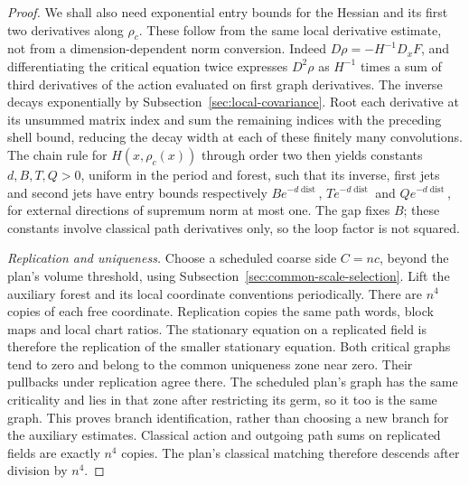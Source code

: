 \begin{proof}
We shall also need exponential entry bounds for the Hessian and its
first two derivatives along $\rho_c$. These follow from the same
local derivative estimate, not from a dimension-dependent norm
conversion. Indeed $D\rho=-H^{-1}D_xF$, and differentiating the
critical equation twice expresses $D^2\rho$ as $H^{-1}$ times a sum
of third derivatives of the action evaluated on first graph derivatives.
The inverse decays exponentially by Subsection~\ref{sec:local-covariance}.
Root each derivative at its unsummed matrix index and sum the remaining
indices with the preceding shell bound, reducing the decay width at
each of these finitely many convolutions. The chain rule for
$H(x,\rho_c(x))$ through order two then yields constants
$d,B,T,Q>0$, uniform in the period and forest, such that its inverse,
first jets and second jets have entry bounds respectively
$Be^{-d\operatorname{dist}}$, $Te^{-d\operatorname{dist}}$ and
$Qe^{-d\operatorname{dist}}$, for external directions of supremum norm
at most one. The gap fixes $B$; these constants involve classical
path derivatives only, so the loop factor is not squared.

\emph{Replication and uniqueness.} Choose a scheduled coarse side
$C=nc$, beyond the plan's volume threshold, using
Subsection~\ref{sec:common-scale-selection}. Lift the auxiliary forest
and its local coordinate conventions periodically. There are $n^4$
copies of each free coordinate. Replication copies the same path words,
block maps and local chart ratios. The stationary equation on a
replicated field is therefore the replication of the smaller stationary
equation. Both critical graphs tend to zero and belong to the common
uniqueness zone near zero. Their pullbacks under replication agree
there. The scheduled plan's graph has the same criticality and lies in
that zone after restricting its germ, so it too is the same graph.
This proves branch identification, rather than choosing a new branch
for the auxiliary estimates. Classical action and outgoing path sums
on replicated fields are exactly $n^4$ copies. The plan's classical
matching therefore descends after division by $n^4$.


\end{proof}

